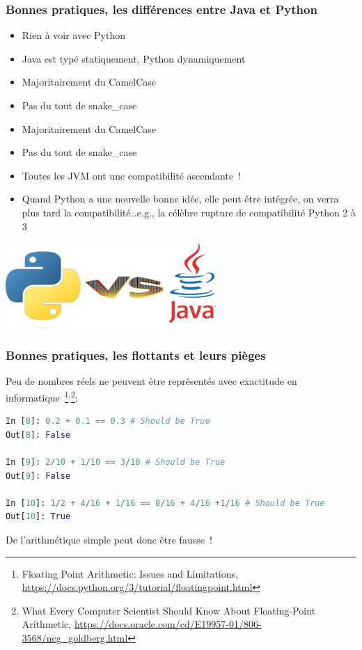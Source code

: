 \documentclass{beamer}
\begin{document}
    \begin{frame}
        \transdissolve
        \frametitle{Bonnes pratiques, les différences entre Java et Python}

        \begin{itemize}

            \item Rien à voir avec Python
            \item Java est typé statiquement, Python dynamiquement
            \item Majoritairement du CamelCase
            \item Pas du tout de snake\_case
            \item Majoritairement du CamelCase
            \item Pas du tout de snake\_case
            \item Toutes les JVM ont une compatibilité ascendante~!
            \item Quand Python a une nouvelle bonne idée, elle peut être intégrée, on verra plus tard la compatibilité\ldots e.g., la célèbre rupture de compatibilité Python 2 à 3

        \end{itemize}

        \centering
        \includegraphics[width=8cm]{image/Java-vs-Python.png}

    \end{frame}

    \begin{frame}[fragile]
        \transdissolve
        \frametitle{Bonnes pratiques, les flottants et leurs pièges}
        \pause
        Peu de nombres réels ne peuvent être représentés avec exactitude en informatique~\footnote{Floating Point Arithmetic: Issues and Limitations, \url{https://docs.python.org/3/tutorial/floatingpoint.html}}\textsuperscript{,}\footnote{What Every Computer Scientist Should Know About Floating-Point Arithmetic, \url{https://docs.oracle.com/cd/E19957-01/806-3568/ncg_goldberg.html}}:

        \begin{lstlisting}[language=python]
In [8]: 0.2 + 0.1 == 0.3 # Should be True
Out[8]: False

In [9]: 2/10 + 1/10 == 3/10 # Should be True
Out[9]: False

In [10]: 1/2 + 4/16 + 1/16 == 8/16 + 4/16 +1/16 # Should be True
Out[10]: True
        \end{lstlisting}

        De l'arithmétique simple peut donc être fausse~!
    \end{frame}
\end{document}
